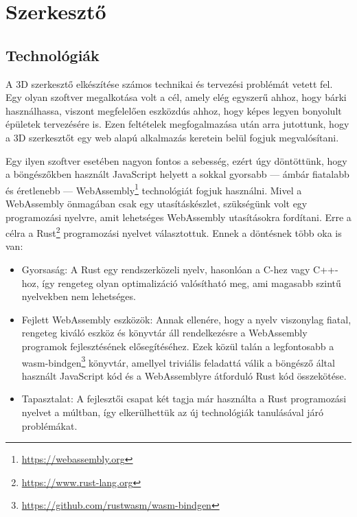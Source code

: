 \section{Szerkesztő}

\subsection{Technológiák}

A 3D szerkesztő elkészítése számos technikai és tervezési problémát vetett fel. Egy olyan szoftver
megalkotása volt a cél, amely elég egyszerű ahhoz, hogy bárki használhassa, viszont megfelelően
eszközdús ahhoz, hogy képes legyen bonyolult épületek tervezésére is. Ezen feltételek
megfogalmazása után arra jutottunk, hogy a 3D szerkesztőt egy web alapú alkalmazás keretein belül
fogjuk megvalósítani.

Egy ilyen szoftver esetében nagyon fontos a sebesség, ezért úgy döntöttünk, hogy a
böngészőkben használt JavaScript helyett a sokkal gyorsabb --- ámbár fiatalabb és éretlenebb ---
WebAssembly\footnote{\url{https://webassembly.org}} technológiát fogjuk használni. Mivel a
WebAssembly önmagában csak egy utasításkészlet, szükségünk volt egy programozási nyelvre,
amit lehetséges WebAssembly utasításokra fordítani. Erre a célra a
Rust\footnote{\url{https://www.rust-lang.org}}
programozási nyelvet választottuk. Ennek a döntésnek több oka is van:

\begin{itemize}
      \item Gyorsaság: A Rust egy rendszerközeli nyelv, hasonlóan a C-hez vagy C++-hoz, így rengeteg
            olyan optimalizáció valósítható meg, ami magasabb szintű nyelvekben nem lehetséges.

      \item Fejlett WebAssembly eszközök: Annak ellenére, hogy a nyelv viszonylag fiatal, rengeteg
            kiváló eszköz és könyvtár áll rendelkezésre a WebAssembly programok fejlesztésének
            elősegítéséhez. Ezek közül talán a legfontosabb a
            wasm-bindgen\footnote{\url{https://github.com/rustwasm/wasm-bindgen}} könyvtár, amellyel
            triviális feladattá válik a böngésző által használt JavaScript kód és a WebAssemblyre
            átforduló Rust kód összekötése.

      \item Tapasztalat: A fejlesztői csapat két tagja már használta a Rust programozási nyelvet a
            múltban, így elkerülhettük az új technológiák tanulásával járó problémákat.
\end{itemize}

